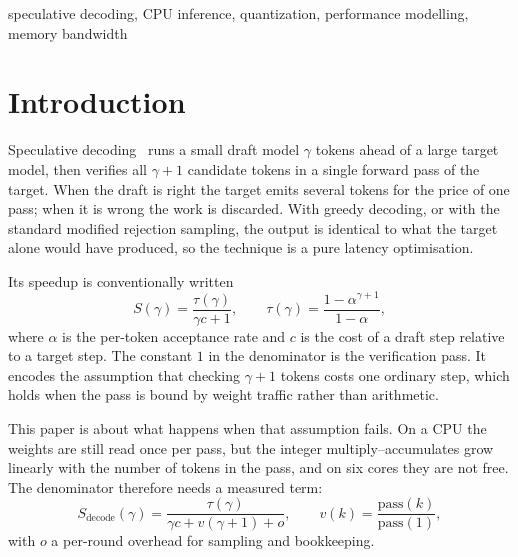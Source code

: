 \documentclass[conference]{IEEEtran}
\begin{document}
\begin{IEEEkeywords}
speculative decoding, CPU inference, quantization, performance modelling, memory bandwidth
\end{IEEEkeywords}

\section{Introduction}

Speculative decoding~\cite{leviathan2023,chen2023} runs a small draft model $\gamma$ tokens ahead of a
large target model, then verifies all $\gamma+1$ candidate tokens in a single forward pass of the
target. When the draft is right the target emits several tokens for the price of one pass; when it is
wrong the work is discarded. With greedy decoding, or with the standard modified rejection sampling,
the output is identical to what the target alone would have produced, so the technique is a pure
latency optimisation.

Its speedup is conventionally written
\begin{equation}
S(\gamma) = \frac{\tau(\gamma)}{\gamma c + 1},
\qquad
\tau(\gamma) = \frac{1 - \alpha^{\gamma+1}}{1 - \alpha},
\label{eq:classic}
\end{equation}
where $\alpha$ is the per-token acceptance rate and $c$ is the cost of a draft step relative to a
target step. The constant $1$ in the denominator is the verification pass. It encodes the assumption
that checking $\gamma+1$ tokens costs one ordinary step, which holds when the pass is bound by weight
traffic rather than arithmetic.

This paper is about what happens when that assumption fails. On a CPU the weights are still read once
per pass, but the integer multiply--accumulates grow linearly with the number of tokens in the pass,
and on six cores they are not free. The denominator therefore needs a measured term:
\begin{equation}
S_{\text{decode}}(\gamma) = \frac{\tau(\gamma)}{\gamma c + v(\gamma+1) + o},
\qquad
v(k) = \frac{\text{pass}(k)}{\text{pass}(1)},
\label{eq:vk}
\end{equation}
with $o$ a per-round overhead for sampling and bookkeeping.
\end{document}
